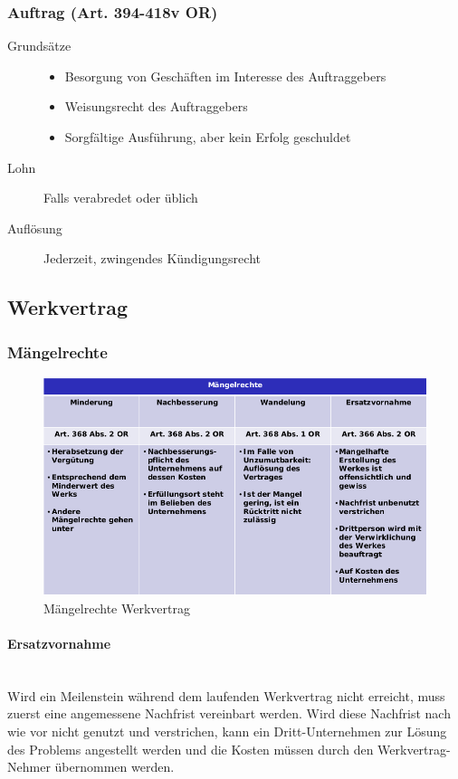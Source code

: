 \subsubsection{Auftrag (Art. 394-418v OR)}

\begin{description}
	\item[Grundsätze] \mbox{}
	\begin{itemize}
		\tightlist
		\item Besorgung von Geschäften im Interesse des Auftraggebers
		\item Weisungsrecht des Auftraggebers
		\item Sorgfältige Ausführung, aber kein Erfolg geschuldet
	\end{itemize}
	\item[Lohn] Falls verabredet oder üblich
	\item[Auflösung] Jederzeit, zwingendes Kündigungsrecht
\end{description}

\subsection{Werkvertrag}

\subsubsection{Mängelrechte}
\label{sec:Werkvertrag-Mängelrechte}
\begin{figure}[H]
	\centering
	\includegraphics[width=.9\textwidth]{figures/maengelRechte.png}
	\caption{Mängelrechte Werkvertrag}
\end{figure}

\paragraph{Ersatzvornahme}\mbox{}\\
Wird ein Meilenstein während dem laufenden Werkvertrag nicht erreicht,
muss zuerst eine angemessene Nachfrist vereinbart werden. Wird diese
Nachfrist nach wie vor nicht genutzt und verstrichen, kann ein
Dritt-Unternehmen zur Lösung des Problems angestellt werden und die
Kosten müssen durch den Werkvertrag-Nehmer übernommen werden.

